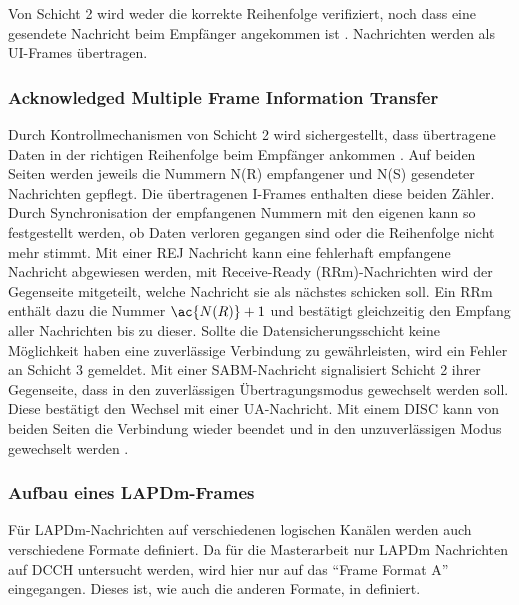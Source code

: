 Von Schicht 2 wird weder die korrekte Reihenfolge verifiziert, noch dass eine gesendete Nachricht beim Empfänger angekommen ist . Nachrichten werden als \ac{UI}-Frames übertragen. 

\subsubsection*{Acknowledged Multiple Frame Information Transfer}

Durch Kontrollmechanismen von Schicht 2 wird sichergestellt, dass übertragene Daten in der richtigen Reihenfolge beim Empfänger ankommen . Auf beiden Seiten werden jeweils die Nummern \ac{N(R)} empfangener und \ac{N(S)} gesendeter Nachrichten gepflegt. Die übertragenen \ac{I}-Frames enthalten diese beiden Zähler. Durch Synchronisation der empfangenen Nummern mit den eigenen kann so festgestellt werden, ob Daten verloren gegangen sind oder die Reihenfolge nicht mehr stimmt. Mit einer \ac{REJ} Nachricht kann eine fehlerhaft empfangene Nachricht abgewiesen werden, mit Receive-Ready (\acs{RRm})-Nachrichten wird der Gegenseite mitgeteilt, welche Nachricht sie als nächstes schicken soll. Ein \ac{RRm} enthält dazu die Nummer $\ac{N(R)} + 1$ und bestätigt gleichzeitig den Empfang aller Nachrichten bis zu dieser. Sollte die Datensicherungsschicht keine Möglichkeit haben eine zuverlässige Verbindung zu gewährleisten, wird ein Fehler an Schicht 3 gemeldet. Mit einer \ac{SABM}-Nachricht signalisiert Schicht 2 ihrer Gegenseite, dass in den zuverlässigen Übertragungsmodus gewechselt werden soll. Diese bestätigt den Wechsel mit einer \ac{UA}-Nachricht. Mit einem \ac{DISC} kann von beiden Seiten die Verbindung wieder beendet und in den unzuverlässigen Modus gewechselt werden .

\subsubsection*{Aufbau eines LAPDm-Frames} \label{hdl:lapdm-format}

Für \ac{LAPDm}-Nachrichten auf verschiedenen logischen Kanälen werden auch verschiedene Formate definiert. Da für die Masterarbeit nur \ac{LAPDm} Nachrichten auf \ac{DCCH} untersucht werden, wird hier nur auf das "`Frame Format A"' eingegangen. Dieses ist, wie auch die anderen Formate, in  definiert.

